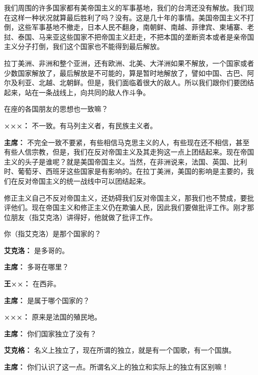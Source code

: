 \begin{duihua}
我们周围的许多国家都有美帝国主义的军事基地，我们的台湾还没有解放。我们现在这样一种状况就算最后胜利了吗？没有。这是几十年的事情。美国帝国主义不打倒，这些军事基地不撤走，日本人民不翻身，南朝鲜、南越、菲律宾、柬埔寨、老挝、泰国、马来亚这些国家不把帝国主义赶走，不把本国的垄断资本或者是亲帝国主义分子打倒，我们这个国家也不能得到最后解放。

拉丁美洲、非洲和整个亚洲，还有欧洲、北美、大洋洲如果不解放，一个国家或者少数国家解放了，最后解放是不可能的，算是暂时地解放了，譬如中国、古巴、阿尔及利亚、北越、北朝鲜。但是，我们面临着很大的敌人。所以我们跟你们要团结起来，站在一条战线上，向共同的敌人作斗争。

在座的各国朋友的思想也一致嘛？

\item[\textbf{×××：}] 不一致。有马列主义者，有民族主义者。

\item[\textbf{主席：}] 不完全一致不要紧，有些相信马克思主义的人，有些现在还不相信，甚至有些人信宗教，但是，我们在反对帝国主义及其走狗这一点上团结起来。现在帝国主义的头子是谁呢？就是美国帝国主义。当然，在非洲说来，法国、英国、比利时、葡萄牙、西班牙这些国家是有影响的。在拉丁美洲，美国的影响是主要的，我们在反对帝国主义的统一战线中可以团结起来。

修正主义自己不反对帝国主义，还妨碍我们反对帝国主义，那我们也不赞成，要批评他们。现在帝国主义和修正主义仍在欺骗人民，因此我们要做批评工作。刚才那位朋友（指艾克洛）讲得好，他就做了批评工作。

你（指艾克洛）是那个国家的？

\item[\textbf{艾克洛：}] 是多哥的。

\item[\textbf{主席：}] 多哥在哪里？

\item[\textbf{王××：}] 在西非。

\item[\textbf{主席：}] 是属于哪个国家的？

\item[\textbf{×××：}] 原来是法国的殖民地。

\item[\textbf{主席：}] 你们国家独立了没有？

\item[\textbf{艾克格：}] 名义上独立了，现在所谓的独立，就是有一个国歌，有一个国旗。

\item[\textbf{主席：}] 你们认识了这一点。所谓名义上的独立和实际上的独立有区别嘛！


\end{duihua}
